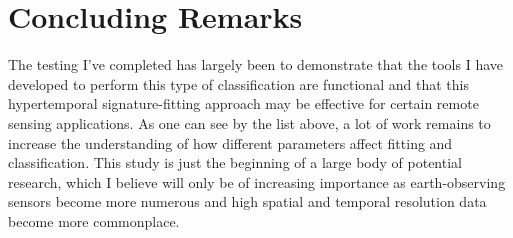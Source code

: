 \section{Concluding Remarks}

The testing I’ve completed has largely been to demonstrate that the tools I have developed to perform this type of classification are functional and that this hypertemporal signature-fitting approach may be effective for certain remote sensing applications. As one can see by the list above, a lot of work remains to increase the understanding of how different parameters affect fitting and classification. This study is just the beginning of a large body of potential research, which I believe will only be of increasing importance as earth-observing sensors become more numerous and high spatial and temporal resolution data become more commonplace.